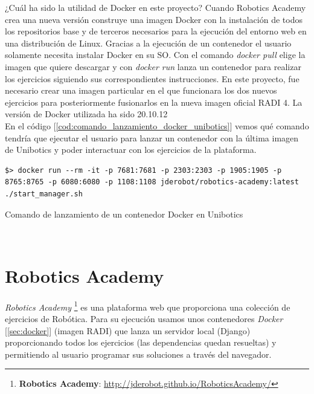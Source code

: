 ¿Cuál ha sido la utilidad de Docker en este proyecto? Cuando Robotics Academy crea una nueva versión construye una imagen Docker con la instalación de todos los repositorios base y de terceros necesarios para la ejecución del entorno web en una distribución de Linux. Gracias a la ejecución de un contenedor el usuario solamente necesita instalar Docker en su SO. Con el comando \textit{docker pull} elige la imagen que quiere descargar y con \textit{docker run} lanza un contenedor para realizar los ejercicios siguiendo sus correspondientes instrucciones. En este proyecto, fue necesario crear una imagen particular en el que funcionara los dos nuevos ejercicios para posteriormente fusionarlos en la nueva imagen oficial RADI 4. La versión de Docker utilizada ha sido 20.10.12\\

En el código [\ref{cod:comando_lanzamiento_docker_unibotics}] vemos qué comando tendría que ejecutar el usuario para lanzar un contenedor con la última imagen de Unibotics y poder interactuar con los ejercicios de la plataforma.\\

\begin{code}[H]
\begin{lstlisting}
$> docker run --rm -it -p 7681:7681 -p 2303:2303 -p 1905:1905 -p 8765:8765 -p 6080:6080 -p 1108:1108 jderobot/robotics-academy:latest ./start_manager.sh
\end{lstlisting}
\caption{Comando de lanzamiento de un contenedor Docker en Unibotics}
\label{cod:comando_lanzamiento_docker_unibotics}
\end{code}\





\section{Robotics Academy}
\label{sec:infraestructura_robotics_academy}

\textit{Robotics Academy} \footnote{\textbf{Robotics Academy}: \url{http://jderobot.github.io/RoboticsAcademy/}} es una plataforma web que proporciona una colección de ejercicios de Robótica. Para su ejecución usamos unos contenedores \textit{Docker} [\ref{sec:docker}]  (imagen RADI) que lanza un servidor local (Django) proporcionando todos los ejercicios (las dependencias quedan resueltas) y permitiendo al usuario programar sus soluciones a través del navegador.\\

